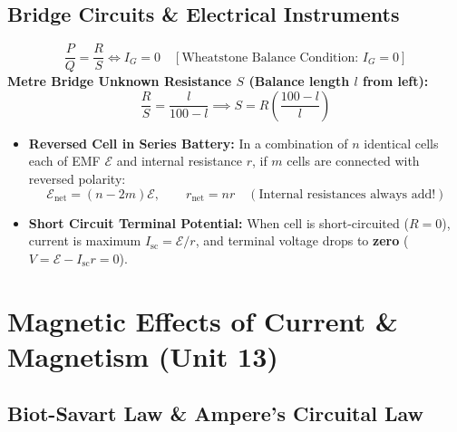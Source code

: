 \documentclass[10pt,twoside,openright]{book}
\begin{document}
\subsection{Bridge Circuits \& Electrical Instruments}

\begin{formulabox}
\begin{equation}
  \frac{P}{Q} = \frac{R}{S} \iff I_G = 0 \quad [\text{Wheatstone Balance Condition: } I_G = 0]
\end{equation}
\textbf{Metre Bridge Unknown Resistance $S$ (Balance length $l$ from left):}
\begin{equation}
  \frac{R}{S} = \frac{l}{100 - l} \implies S = R\left(\frac{100 - l}{l}\right)
\end{equation}
\end{formulabox}

\begin{trapbox}
\begin{itemize}
  \item \textbf{Reversed Cell in Series Battery:} In a combination of $n$ identical cells each of EMF $\mathcal{E}$ and internal resistance $r$, if $m$ cells are connected with reversed polarity:
  \begin{equation*}
    \mathcal{E}_{\text{net}} = (n - 2m)\mathcal{E}, \qquad r_{\text{net}} = n r \quad (\text{Internal resistances always add!})
  \end{equation*}
  \item \textbf{Short Circuit Terminal Potential:} When cell is short-circuited ($R=0$), current is maximum $I_{\text{sc}} = \mathcal{E}/r$, and terminal voltage drops to \textbf{zero} ($V = \mathcal{E} - I_{\text{sc}}r = 0$).
\end{itemize}
\end{trapbox}

\newpage

\section{Magnetic Effects of Current \& Magnetism (Unit 13)}

\subsection{Biot-Savart Law \& Ampere's Circuital Law}
\end{document}
